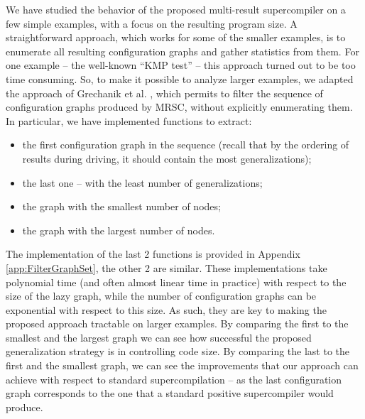 \documentclass[submission,copyright,creativecommons]{eptcs}
\begin{document}
We have studied the behavior of the proposed multi-result supercompiler on a few simple
examples, with a focus on the resulting program size.
A straightforward approach, which works for some of the smaller examples,
is to enumerate all resulting configuration graphs and gather statistics from them.
For one example -- the well-known ``KMP test'' -- this approach turned out to be too
time consuming.
So, to make it possible to analyze larger examples, we adapted the approach 
of Grechanik et al. \cite{Romanenko2014StagedMRSC}, which permits to filter
the sequence of configuration graphs produced by MRSC, without explicitly
enumerating them.
In particular, we have implemented functions to extract:
\begin{itemize}
  \item the first configuration graph in the sequence (recall that by the ordering of 
    results during driving, it should contain the most generalizations);
  \item the last one -- with the least number of generalizations;
  \item the graph with the smallest number of nodes;
  \item the graph with the largest number of nodes.
\end{itemize}
The implementation of the last 2 functions is provided in Appendix \ref{app:FilterGraphSet},
the other 2 are similar.
These implementations take polynomial time (and often almost linear time in practice)  
with respect to the size of the lazy graph,
while the number of configuration graphs can be exponential with respect to this size.
As such, they are key to making the proposed approach tractable on larger examples.
By comparing the first to the smallest and the largest graph we can see how 
successful the proposed generalization strategy is in controlling code size.
By comparing the last to the first and the smallest graph, we can see the improvements
that our approach can achieve with respect to standard supercompilation --
as the last configuration graph corresponds to the one that a standard positive supercompiler would produce.
\end{document}
